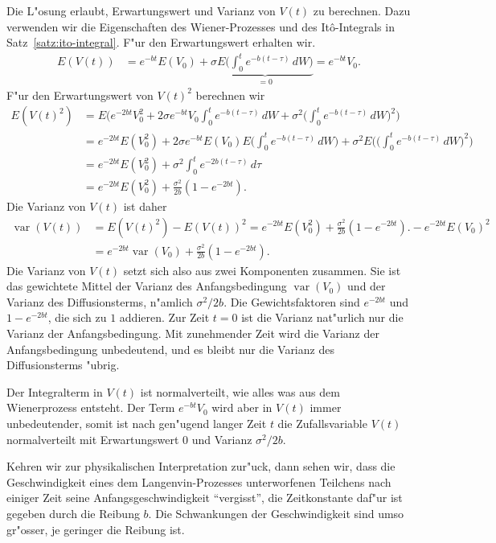 Die L"osung erlaubt, Erwartungswert und Varianz von $V(t)$ zu berechnen.
Dazu verwenden wir die Eigenschaften des Wiener-Prozesses und des
It\^o-Integrals in Satz~\ref{satz:ito-integral}.
F"ur den Erwartungswert erhalten wir.
\begin{align*}
E(V(t))
&=
e^{-bt}E(V_0)
+
\sigma \underbrace{E\biggl(\int_0^t e^{-b(t-\tau)}\,dW\biggr)}_{\textstyle=0}
=
e^{-bt}V_0.
\end{align*}
F"ur den Erwartungswert von $V(t)^2$ berechnen wir
\begin{align*}
E(V(t)^2)
&=
E\biggl(e^{-2bt}V_0^2+2\sigma e^{-bt}V_0\int_0^te^{-b(t-\tau)}\,dW
+\sigma^2\biggl(\int_0^t e^{-b(t-\tau)}\,dW\biggr)^2
\biggr)
\\
&=
e^{-2bt}E(V_0^2)
+
2\sigma e^{-bt}E(V_0)E\biggl( \int_0^te^{-b(t-\tau)}\,dW\biggr)
+
\sigma^2E\biggl(\biggl(\int_0^t e^{-b(t-\tau)}\,dW\biggr)^2\biggr)
\\
&=
e^{-2bt}E(V_0^2)
+
\sigma^2 \int_0^t e^{-2b(t-\tau)}\,d\tau
\\
&=
e^{-2bt}E(V_0^2)
+
\frac{\sigma^2}{2b}(1-e^{-2bt}).
\end{align*}
Die Varianz von $V(t)$ ist daher
\begin{align*}
\operatorname{var}(V(t))
&=
E(V(t)^2)-E(V(t))^2
=
e^{-2bt}E(V_0^2)
+
\frac{\sigma^2}{2b}(1-e^{-2bt}).
-
e^{-2bt}E(V_0)^2
\\
&=
e^{-2bt}\operatorname{var}(V_0)
+
\frac{\sigma^2}{2b}(1-e^{-2bt}).
\end{align*}
Die Varianz von $V(t)$ setzt sich also aus zwei Komponenten zusammen.
Sie ist das gewichtete Mittel der Varianz des Anfangsbedingung
$\operatorname{var}(V_0)$ und der Varianz des Diffusionsterms, n"amlich
$\sigma^2/2b$.
Die Gewichtsfaktoren sind $e^{-2bt}$ und $1-e^{-2bt}$, die sich zu
$1$ addieren.
Zur Zeit $t=0$ ist die Varianz nat"urlich nur die Varianz der Anfangsbedingung.
Mit zunehmender Zeit wird die Varianz der Anfangsbedingung unbedeutend,
und es bleibt nur die Varianz des Diffusionsterms "ubrig.

Der Integralterm in $V(t)$ ist normalverteilt, wie alles was aus dem
Wienerprozess entsteht.
Der Term $e^{-bt}V_0$ wird aber in $V(t)$ immer unbedeutender, somit ist
nach gen"ugend langer Zeit $t$ die Zufallsvariable $V(t)$ normalverteilt
mit Erwartungswert $0$ und Varianz $\sigma^2/2b$.

Kehren wir zur physikalischen Interpretation zur"uck, dann sehen wir,
dass die Geschwindigkeit eines dem Langenvin-Prozesses unterworfenen
Teilchens nach einiger Zeit seine Anfangsgeschwindigkeit ``vergisst'',
die Zeitkonstante daf"ur ist gegeben durch die Reibung $b$.
Die Schwankungen der Geschwindigkeit sind umso gr"osser, je geringer
die Reibung ist.


